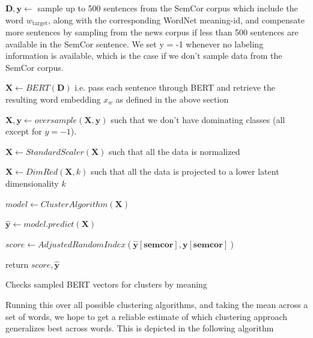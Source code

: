 \documentclass[a4paper,12pt,twoside,openright]{report}
\begin{document}
\begin{algorithm}[H]
\SetAlgoLined
{}

 $\mathbf{D}, \mathbf{y} \leftarrow $  sample up to 500 sentences from the SemCor corpus which include the word $w_{\text{target}}$, along with the corresponding WordNet meaning-id, and compensate more sentences by sampling from the news corpus if less than 500 sentences are available in the SemCor sentence.
We set y = -1 whenever no labeling information is available, which is the case if we don't sample data from the SemCor corpus.\;

$ \mathbf{X} \leftarrow BERT( \mathbf{D} )$ i.e. pass each sentence through BERT and retrieve the resulting word embedding $x_w$ as defined in the above section\;
 
$ \mathbf{X}, \mathbf{y} \leftarrow oversample( \mathbf{X}, \mathbf{y} )$ such that we don't have dominating classes (all except for $y = -1$).\;
 
$ \mathbf{X} \leftarrow StandardScaler( \mathbf{X})$ such that all the data is normalized\;

$ \mathbf{X} \leftarrow DimRed( \mathbf{X}, k )$ such that all the data is projected to a lower latent dimensionality $k$\;

$ model \leftarrow ClusterAlgorithm( \mathbf{X})$ \;

$ \mathbf{\hat{y}} \leftarrow model.predict(\mathbf{X}) $ \;

$ score \leftarrow AdjustedRandomIndex(\mathbf{\hat{y}[semcor]}, \mathbf{y[semcor]}) $ \;

return $ score, \mathbf{\hat{y}}$\;
    
 \caption{Checks sampled BERT vectors for clusters by  meaning}
\end{algorithm}

\hfill \break

Running this over all possible clustering algorithms, and taking the mean across a set of words, we hope to get a reliable estimate of which clustering approach generalizes best across words.
This is depicted in the following algorithm
\end{document}
